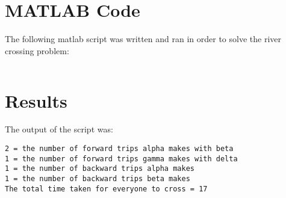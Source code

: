 \documentclass{article}
\begin{document}
\section{MATLAB Code}

The following matlab script was written and ran in order to solve the river crossing problem:

\begin{lstlisting}
\end{lstlisting}

\section{Results}

The output of the script was:

\begin{verbatim}
2 = the number of forward trips alpha makes with beta
1 = the number of forward trips gamma makes with delta
1 = the number of backward trips alpha makes
1 = the number of backward trips beta makes
The total time taken for everyone to cross = 17
\end{verbatim}
\end{document}
